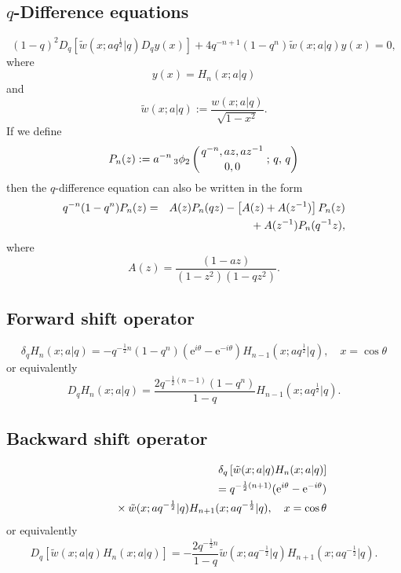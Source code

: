 \documentclass[envcountchap,graybox]{svmono}
\newcommand{\qhyp}[5]{\mbox{}_{#1}{\phi}_{#2}
\left(\genfrac{}{}{0pt}{}{#3}{#4}\,;\,q,\,#5\right)}
\newcommand{\mathindent}{\hspace{7.5mm}}
\newcommand{\e}{\textrm{e}}
\begin{document}
\subsection*{$q$-Difference equations}
\begin{equation}
\label{dvContBigqHermite1}
(1-q)^2D_q\left[{\tilde w}(x;aq^{\frac{1}{2}}|q)D_qy(x)\right]
+4q^{-n+1}(1-q^n){\tilde w}(x;a|q)y(x)=0,
\end{equation}
where
$$y(x)=H_n(x;a|q)$$
and
$${\tilde w}(x;a|q):=\frac{w(x;a|q)}{\sqrt{1-x^2}}.$$
If we define
$$P_n(z):=a^{-n}\,\qhyp{3}{2}{q^{-n},az,az^{-1}}{0,0}{q}$$
then the $q$-difference equation can also be written in the form
\begin{eqnarray}
\label{dvContBigqHermite2}
q^{-n}(1-q^n)P_n(z)&=&A(z)P_n(qz)-\left[A(z)+A(z^{-1})\right]P_n(z)\nonumber\\
& &{}\mathindent{}+A(z^{-1})P_n(q^{-1}z),
\end{eqnarray}
where
$$A(z)=\frac{(1-az)}{(1-z^2)(1-qz^2)}.$$

\subsection*{Forward shift operator}
\begin{equation}
\label{shift1ContBigqHermiteI}
\delta_qH_n(x;a|q)=-q^{-\frac{1}{2}n}(1-q^n)(\e^{i\theta}-\e^{-i\theta})
H_{n-1}(x;aq^{\frac{1}{2}}|q),\quad x=\cos\theta
\end{equation}
or equivalently
\begin{equation}
\label{shift1ContBigqHermiteII}
D_qH_n(x;a|q)=\frac{2q^{-\frac{1}{2}(n-1)}(1-q^n)}{1-q}
H_{n-1}(x;aq^{\frac{1}{2}}|q).
\end{equation}

\subsection*{Backward shift operator}
\begin{eqnarray}
\label{shift2ContBigqHermiteI}
& &\delta_q\left[{\tilde w}(x;a|q)H_n(x;a|q)\right]\nonumber\\
& &{}=q^{-\frac{1}{2}(n+1)}(\e^{i\theta}-\e^{-i\theta})\nonumber\\
& &{}\mathindent{}\times
{\tilde w}(x;aq^{-\frac{1}{2}}|q)H_{n+1}(x;aq^{-\frac{1}{2}}|q),\quad x=\cos\theta
\end{eqnarray}
or equivalently
\begin{equation}
\label{shift2ContBigqHermiteII}
D_q\left[{\tilde w}(x;a|q)H_n(x;a|q)\right]=
-\frac{2q^{-\frac{1}{2}n}}{1-q}{\tilde w}(x;aq^{-\frac{1}{2}}|q)H_{n+1}(x;aq^{-\frac{1}{2}}|q).
\end{equation}
\end{document}
